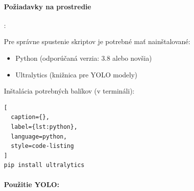 \paragraph{Požiadavky na prostredie}:

Pre správne spustenie skriptov je potrebné mať nainštalované:

\begin{itemize}
    \item Python (odporúčaná verzia: 3.8 alebo novšia)
    \item Ultralytics (knižnica pre YOLO modely)
\end{itemize}
Inštalácia potrebných balíkov (v termináli):
\begin{lstlisting}[
  caption={},
  label={lst:python},
  language=python,
  style=code-listing
]
pip install ultralytics

\end{lstlisting}

\paragraph{Použitie YOLO:}


